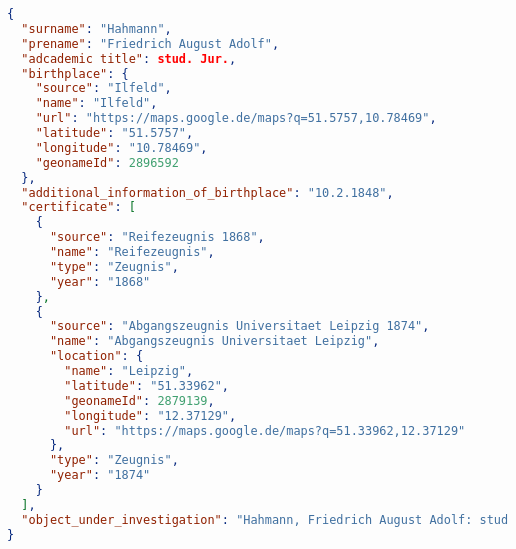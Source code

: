 \documentclass[12pt,a4paper]{article}
\begin{document}
\begin{footnotesize}

\enlargethispage{\baselineskip}
\begin{lstlisting}[language=JSON]
{
  "surname": "Hahmann",
  "prename": "Friedrich August Adolf",
  "adcademic title": stud. Jur.,
  "birthplace": {
    "source": "Ilfeld",
    "name": "Ilfeld",
    "url": "https://maps.google.de/maps?q=51.5757,10.78469",
    "latitude": "51.5757",
    "longitude": "10.78469",
    "geonameId": 2896592
  },
  "additional_information_of_birthplace": "10.2.1848",
  "certificate": [
    {
      "source": "Reifezeugnis 1868",
      "name": "Reifezeugnis",
      "type": "Zeugnis",
      "year": "1868"
    },
    {
      "source": "Abgangszeugnis Universitaet Leipzig 1874",
      "name": "Abgangszeugnis Universitaet Leipzig",
      "location": {
        "name": "Leipzig",
        "latitude": "51.33962",
        "geonameId": 2879139,
        "longitude": "12.37129",
        "url": "https://maps.google.de/maps?q=51.33962,12.37129"
      },
      "type": "Zeugnis",
      "year": "1874"
    }
  ],
  "object_under_investigation": "Hahmann, Friedrich August Adolf: stud. Jur., geb. Ilfeld 10.2.1848-- Reifezeugnis 1868, Abgangszeugnis Universitaet Leipzig 1874"
}
\end{lstlisting}

\end{footnotesize}

\end{document}
